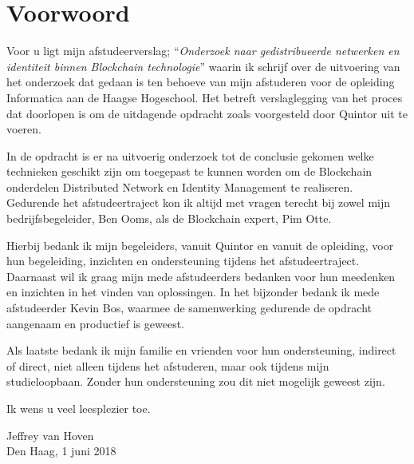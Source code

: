 \chapter*{Voorwoord}

Voor u ligt mijn afstudeerverslag; ``\textit{Onderzoek naar gedistribueerde netwerken en identiteit binnen Blockchain technologie}'' waarin ik schrijf over de uitvoering van het onderzoek dat gedaan is ten behoeve van mijn afstuderen voor de opleiding Informatica aan de Haagse Hogeschool. Het betreft verslaglegging van het proces dat doorlopen is om de uitdagende opdracht zoals voorgesteld door Quintor uit te voeren.

In de opdracht is er na uitvoerig onderzoek tot de conclusie gekomen welke technieken geschikt zijn om toegepast te kunnen worden om de Blockchain onderdelen Distributed Network en Identity Management te realiseren. Gedurende het afstudeertraject kon ik altijd met vragen terecht bij zowel mijn bedrijfsbegeleider, Ben Ooms, als de Blockchain expert, Pim Otte.

Hierbij bedank ik mijn begeleiders, vanuit Quintor en vanuit de opleiding, voor hun begeleiding, inzichten en ondersteuning tijdens het afstudeertraject. Daarnaast wil ik graag mijn mede afstudeerders bedanken voor hun meedenken en inzichten in het vinden van oplossingen. In het bijzonder bedank ik mede afstudeerder Kevin Bos, waarmee de samenwerking gedurende de opdracht aangenaam en productief is geweest. 

Als laatste bedank ik mijn familie en vrienden voor hun ondersteuning, indirect of direct, niet alleen tijdens het afstuderen, maar ook tijdens mijn studieloopbaan. Zonder hun ondersteuning zou dit niet mogelijk geweest zijn.

Ik wens u veel leesplezier toe.

\bigskip
\bigskip

Jeffrey van Hoven \\
Den Haag, 1 juni 2018
